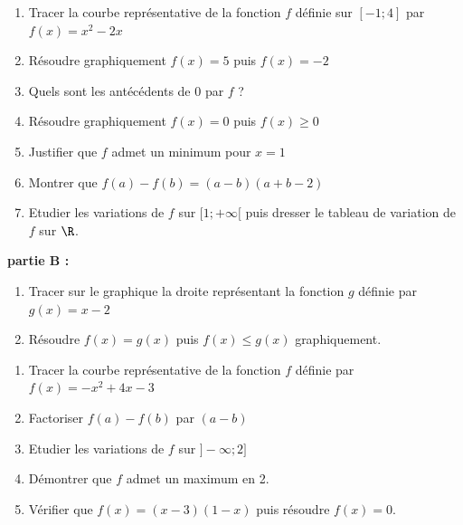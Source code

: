 \begin{enumerate}
\item Tracer la courbe représentative de la fonction $f$ définie sur $[ -1 ; 4 ]$ par $f(x) = x^2-2x$
\item Résoudre graphiquement $f(x) = 5$ puis $f(x) = -2$ 

\item Quels sont les antécédents de 0 par $f$ ?

\item Résoudre graphiquement $f(x) = 0$ puis $f(x)\geq 0$

\item Justifier que $f$ admet un minimum pour $x=1$
\item Montrer que $f(a)-f(b)=(a-b)(a+b-2)$
\item Etudier les variations de $f$ sur $[1 ;+\infty[$ puis dresser le tableau de variation de $f$ sur $\R$. 
\end{enumerate}

\medskip

\textbf{partie B :}

\medskip

\begin{enumerate}
\item Tracer sur le graphique la droite représentant la fonction $g$ définie par $g(x) = x-2$
\item Résoudre $f(x) = g(x)$ puis $f(x)\leq g(x)$ graphiquement.
\end{enumerate}

\medskip

\exo 


\begin{enumerate}
\item Tracer la courbe représentative de la fonction $f$ définie par $f(x) = - x^2 + 4 x - 3$
\item Factoriser $f(a)-f(b)$ par $(a-b)$
\item Etudier les variations de $f$ sur  $]-\infty ; 2]$ 
\item Démontrer que $f$ admet un maximum en 2.
\item Vérifier que $f(x) = (x-3)(1-x)$ puis résoudre $f(x)=0$.
\end{enumerate}

\exo

